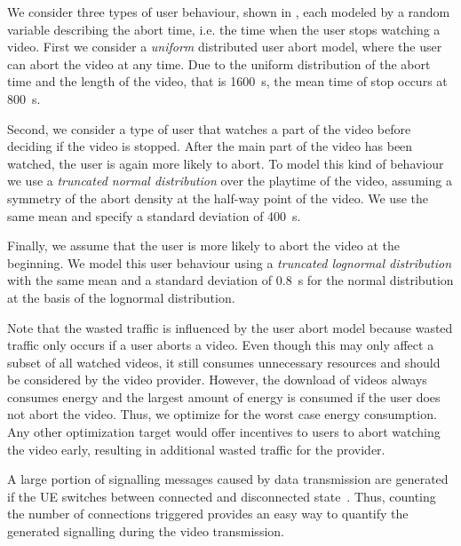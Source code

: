 We consider three types of user behaviour, shown in , each modeled by a random variable describing the abort time, i.e. the time when the user stops watching a video.
First we consider a \emph{uniform} distributed user abort model, where the user can abort the video at any time.
Due to the uniform distribution of the abort time and the length of the video, that is \SI{1600}{\second}, the mean time of stop occurs at \SI{800}{\second}.

Second, we consider a type of user that watches a part of the video before deciding if the video is stopped. 
After the main part of the video has been watched, the user is again more likely to abort.
To model this kind of behaviour we use a \emph{truncated normal distribution} over the playtime of the video, assuming a symmetry of the abort density at the half-way point of the video.
We use the same mean and specify a standard deviation of \SI{400}{\second}.

Finally, we assume that the user is more likely to abort the video at the beginning.
We model this user behaviour using a \emph{truncated lognormal distribution} with the same mean and a standard deviation of \SI{0.8}{\second} for the normal distribution at the basis of the lognormal distribution.

Note that the wasted traffic \meanwastedtraffic is influenced by the user abort model because wasted traffic only occurs if a user aborts a video.
Even though this may only affect a subset of all watched videos, it still consumes unnecessary resources and should be considered by the video provider.
However, the download of videos always consumes energy and the largest amount of energy is consumed if the user does not abort the video.
Thus, we optimize for the worst case energy consumption.
Any other optimization target would offer incentives to users to abort watching the video early, resulting in additional wasted traffic for the provider.


A large portion of signalling messages caused by data transmission are generated if the \gls{UE} switches between connected and disconnected state~\cite{3GPP_RRC_Spec}.
Thus, counting the number of connections \connectioncount triggered provides an easy way to quantify the generated signalling during the video transmission.

